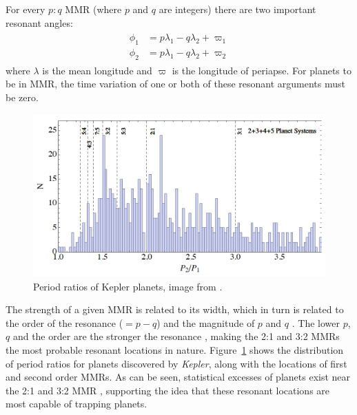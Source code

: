 \documentclass[12pt,letter]{aastex}
\newcommand{\kep}{{\it Kepler}\xspace}
\begin{document}
For every $p:q$ MMR (where $p$ and $q$ are integers) there are two important resonant angles:
\begin{align*}
\begin{split}
\phi_1 &= p\lambda_1 - q\lambda_2 + \varpi_1 \\
\phi_2 &= p\lambda_1 - q\lambda_2 + \varpi_2 
\end{split}
\end{align*}
where $\lambda$ is the mean longitude and $\varpi$ is the longitude of periapse. 
For planets to be in MMR, the time variation of one or both of these resonant arguments must be zero.

\begin{figure}
\centering
\includegraphics[width=1.00\textwidth]{Figures/KeplerPeriods.png}
\caption{
\footnotesize Period ratios of Kepler planets, image from \citet{Goldreich2014}.}
\label{fig:KepMMR}
\end{figure}

The strength of a given MMR is related to its width, which in turn is related to the order of the resonance ($= p - q$)  and the magnitude of $p$ and $q$ \citep{SSD1999}. 
The lower $p$, $q$ and the order are the stronger the resonance \citep{SSD1999}, making the 2:1 and 3:2 MMRs the most probable resonant locations in nature. 
Figure~\ref{fig:KepMMR} shows the distribution of period ratios for planets discovered by \kep, along with the locations of first and second order MMRs. 
As can be seen, statistical excesses of planets exist near the 2:1 and 3:2 MMR \citep{Lissauer2011,Fabrycky2014,Steffen2015}, supporting the idea that these resonant locations are most capable of trapping planets.
\end{document}
